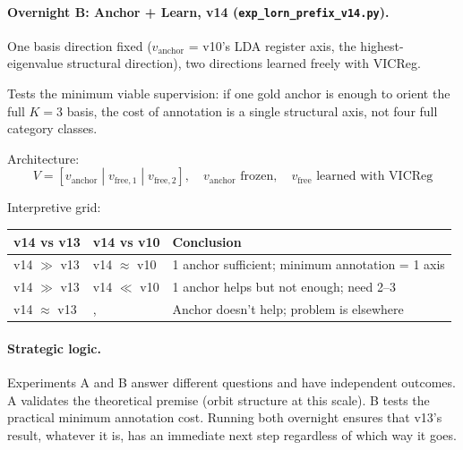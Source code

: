 \documentclass[11pt, a4paper]{article}
\theoremstyle{plain}
\theoremstyle{definition}
\theoremstyle{remark}
\begin{document}
\paragraph{Overnight B: Anchor + Learn, v14 (\texttt{exp\_lorn\_prefix\_v14.py}).}
One basis direction fixed ($v_{\text{anchor}}$ = v10's LDA register axis, the
highest-eigenvalue structural direction), two directions learned freely with VICReg.

Tests the minimum viable supervision: if one gold anchor is enough to orient the
full $K=3$ basis, the cost of annotation is a single structural axis, not four
full category classes.

Architecture:
\begin{equation}
V = [v_{\text{anchor}} \;|\; v_{\text{free},1} \;|\; v_{\text{free},2}], \quad
v_{\text{anchor}} \text{ frozen},\quad v_{\text{free}} \text{ learned with VICReg}
\end{equation}

Interpretive grid:
\begin{center}\small
\begin{tabular}{lll}
\toprule
\textbf{v14 vs v13} & \textbf{v14 vs v10} & \textbf{Conclusion} \\
\midrule
v14 $\gg$ v13 & v14 $\approx$ v10 & 1 anchor sufficient; minimum annotation = 1 axis \\
v14 $\gg$ v13 & v14 $\ll$ v10 & 1 anchor helps but not enough; need 2--3 \\
v14 $\approx$ v13 & ,           & Anchor doesn't help; problem is elsewhere \\
\bottomrule
\end{tabular}
\end{center}

\paragraph{Strategic logic.}
Experiments A and B answer different questions and have independent outcomes.
A validates the theoretical premise (orbit structure at this scale).
B tests the practical minimum annotation cost.
Running both overnight ensures that v13's result, whatever it is, has
an immediate next step regardless of which way it goes.
\end{document}
